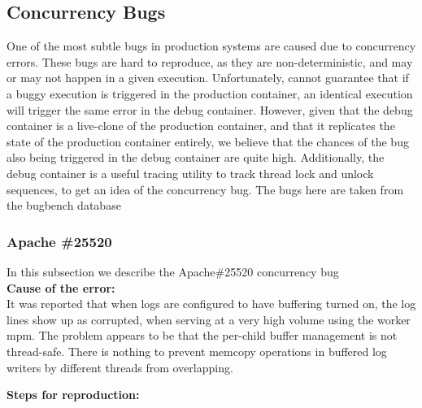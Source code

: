 \subsection{Concurrency Bugs}
One of the most subtle bugs in production systems are caused due to concurrency errors.
These bugs are hard to reproduce, as they are non-deterministic, and may or may not happen in a given execution.
Unfortunately, \parikshan cannot guarantee that if a buggy execution is triggered in the production container, an identical execution will trigger the same error in the debug container.
However, given that the debug container is a live-clone of the production container, and that it replicates the state of the production container entirely, we believe that the chances of the bug also being triggered in the debug container are quite high.
Additionally, the debug container is a useful tracing utility to track thread lock and unlock sequences, to get an idea of the concurrency bug.
The bugs here are taken from the bugbench database~\cite{bugbench}

\subsubsection{Apache \#25520}

In this subsection we describe the Apache\#25520 concurrency bug \\

\noindent \textbf{Cause of the error:} \\

It was reported that when logs are configured to have buffering turned on, the log lines show up as corrupted, when serving at a very high volume using the worker mpm.
The problem appears to be that the per-child buffer management is not thread-safe.
There is nothing to prevent memcopy operations in buffered log writers by different threads from overlapping.
 

\noindent \textbf{Steps for reproduction:} \\

